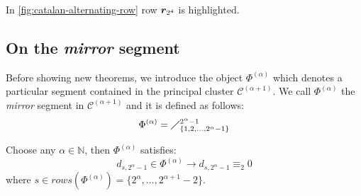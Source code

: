 
In \autoref{fig:catalan-alternating-row} row $\boldsymbol{r}_{2^{4}}$ is highlighted.

\subsection{On the \emph{mirror} segment}

Before showing new theorems, we introduce the object
$\Phi^{(\alpha)}$ which denotes a particular segment contained 
in the principal cluster $\mathcal{C}^{(\alpha+1)}$. 
We call $\Phi^{(\alpha)}$ the \emph{mirror} segment in 
$\mathcal{C}^{(\alpha+1)}$ and it is defined as follows:
\begin{displaymath}
    \Phi^{(\alpha)}=\diagup_{\lbrace 1,2,\ldots,2^{\alpha}-1\rbrace}^{2^{\alpha}-1}
\end{displaymath}

\begin{theorem}
    Choose any $\alpha\in\mathbb{N}$, then $\Phi^{(\alpha)}$ satisfies: 
    \begin{displaymath}
        d_{s,2^{\alpha}-1}\in\Phi^{(\alpha)} \rightarrow d_{s,2^{\alpha}-1}\equiv_{2}0
    \end{displaymath}
    where $s\in rows\left(\Phi^{(\alpha)}\right)=\lbrace2^{\alpha},\ldots,2^{\alpha+1}-2\rbrace$.
    \label{thm:mirror:segment:definition}
\end{theorem}

